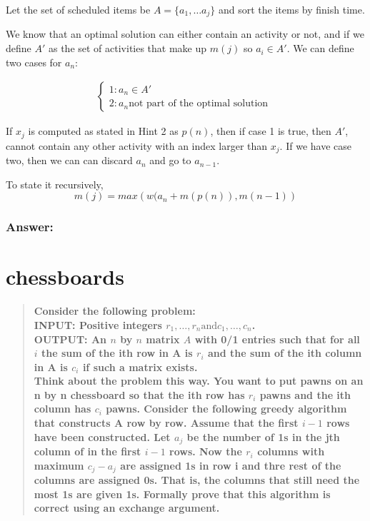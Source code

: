 \documentclass[titlepage]{article}\usepackage[]{graphicx}\usepackage[]{color}
\begin{document}
Let the set of scheduled items be $A = \{ a_1, \dots a_j\}$ and sort the
items by finish time. 

We know that an optimal solution can either contain an activity or not, and if
we define $A'$ as the set of activities that make up $m(j)$ so 
$a_i \in A'$. We can define two cases for $a_n$:

  \begin{align*}
	  \begin{cases}
		  1: a_n \in A' \\
		  2: a_n \text{not part of the optimal solution } 
	  \end{cases}
  \end{align*}

  If $x_j$ is computed as stated in Hint 2 as $p(n)$, then if case 1 is true, then $A'$,
  cannot contain any other activity with an index larger than $x_j$. If we have
  case two, then we can can discard $a_n$ and go to $a_{n-1}$. 

  To state it recursively, 
  \[ m(j) = max \left( w(a_n + m(p(n)), m(n-1) \right) \]


\subsubsection{Answer: }


\section{chessboards}

\begin{quote}
  \textbf{Consider the following problem: \\
	INPUT: Positive integers $r_1, \dots , r_n \text{and} c_1, \dots , c_n$. \\
	OUTPUT: An $n$ by $n$ matrix $A$ with 0/1 entries such that for all $i$ the
	sum of the ith row in A is $r_i$ and the sum of the ith column in A is
	$c_i$ if such a matrix exists. \\
	Think about the problem this way. You want to put pawns on an n by n
	chessboard so that the ith row has $r_i$ pawns and the ith column has $c_i$
	pawns. Consider the following greedy algorithm that constructs A row by
	row. Assume that the first $i - 1$ rows have been constructed. Let $a_j$ be
	the number of 1s in the jth column of in the first $i-1$ rows. Now the
	$r_i$ columns with maximum $c_j - a_j$ are assigned 1s in row i and thre
	rest of the columns are assigned 0s. That is, the columns that still need
	the most 1s are given 1s. Formally prove that this algorithm is correct
  using an exchange argument.}
\end{quote}
\end{document}
